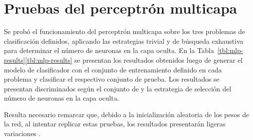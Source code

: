 %
%
%
\section{Pruebas del perceptrón multicapa}
%
Se probó el funcionamiento del perceptrón multicapa sobre los tres
problemas de clasificación definidos, aplicando las estrategias
trivial y de búsqueda exhaustiva para determinar el número de neuronas
en la capa oculta.
En la \iflatexml{}Tabla~\ref{tbl:mlp-results}\else\autoref{tbl:mlp-results}\fi{}
se presentan los resultados obtenidos luego de generar el modelo
de clasificador con el conjunto de entrenamiento definido en cada
problema y clasificar el respectivo conjunto de prueba.
Los resultados se presentan discriminados según el conjunto de
 y la estrategia de selección del número de neuronas en la
capa oculta.

Resulta necesario remarcar que, debido a la inicialización aleatoria
de los pesos de la red, al intentar replicar estas pruebas, los
resultados presentarán ligeras variaciones .

